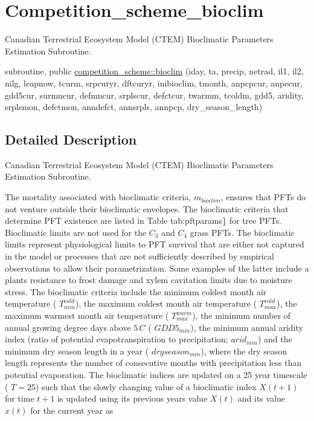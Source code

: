 \hypertarget{group__competition__scheme__bioclim}{}\section{Competition\+\_\+scheme\+\_\+bioclim}
\label{group__competition__scheme__bioclim}


Canadian Terrestrial Ecosystem Model (C\+T\+E\+M) Bioclimatic Parameters Estimation Subroutine.  


\begin{DoxyCompactItemize}
\item 
subroutine, public \hyperlink{group__competition__scheme__bioclim_ga8976936d6f76c8619f6602153b8355f9}{competition\+\_\+scheme\+::bioclim} (iday, ta, precip, netrad, il1, il2, nilg, leapnow, tcurm, srpcuryr, dftcuryr, inibioclim, tmonth, anpcpcur, anpecur, gdd5cur, surmncur, defmncur, srplscur, defctcur, twarmm, tcoldm, gdd5, aridity, srplsmon, defctmon, anndefct, annsrpls, annpcp, dry\+\_\+season\+\_\+length)
\end{DoxyCompactItemize}


\subsection{Detailed Description}
Canadian Terrestrial Ecosystem Model (C\+T\+E\+M) Bioclimatic Parameters Estimation Subroutine. 

The mortality associated with bioclimatic criteria, $m_{bioclim}$, ensures that P\+F\+Ts do not venture outside their bioclimatic envelopes. The bioclimatic criteria that determine P\+F\+T existence are listed in Table tab\+:pftparams\} for tree P\+F\+Ts. Bioclimatic limits are not used for the $C_3$ and $C_4$ grass P\+F\+Ts. The bioclimatic limits represent physiological limits to P\+F\+T survival that are either not captured in the model or processes that are not sufficiently described by empirical observations to allow their parametrization. Some examples of the latter include a plant\textquotesingle{}s resistance to frost damage and xylem cavitation limits due to moisture stress. The bioclimatic criteria include the minimum coldest month air temperature ( $T^{cold}_{min}$), the maximum coldest month air temperature ( $T^{cold}_{max}$), the maximum warmest month air temperature ( $T^{warm}_{max}$), the minimum number of annual growing degree days above $5\,C$ ( $GDD5_{min}$), the minimum annual aridity index (ratio of potential evapotranspiration to precipitation; $arid_{min}$) and the minimum dry season length in a year ( $dryseason_{min}$), where the dry season length represents the number of consecutive months with precipitation less than potential evaporation. The bioclimatic indices are updated on a 25 year timescale ( $T=25$) such that the slowly changing value of a bioclimatic index $X(t+1)$ for time $t+1$ is updated using its previous year\textquotesingle{}s value $X(t)$ and its value $x(t)$ for the current year as

